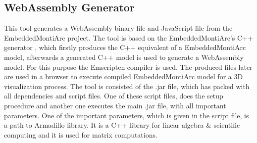 \subsection{WebAssembly Generator} \label{sec:emam2wasm}
This tool generates a WebAssembly binary file \cite{WebAssembly} and JavaScript file from the EmbeddedMontiArc project. The tool is based on the EmbeddedMontiArc's C++ generator \cite{CPPGenBA17,CPPComp}, which firstly produces the C++ equivalent of a EmbeddedMontiArc model, afterwards a generated C++ model is used to generate a WebAssembly model. For this purpose the Emscripten compiler \cite{Emscripten, zakai2011emscripten} is used. The produced files later are used in a browser to execute compiled EmbeddedMontiArc model for a 3D visualization process. \newline
The tool is consisted of the .jar file, which has packed with all dependencies and script files. One of these script files, does the setup procedure and another one executes the main .jar file, with all important parameters. One of the important parameters, which is given in the script file, is a path to Armadillo \cite{Armadillo, sanderson2010armadillo, sanderson2016armadillo} library. It is a C++ library for linear algebra \& scientific computing and it is used for matrix computations.

